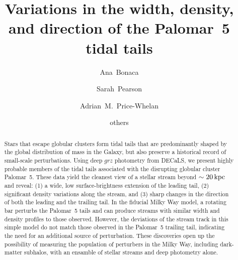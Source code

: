\documentclass[twocolumn]{aastex62}
\begin{document}
\sloppy\sloppypar\raggedbottom\frenchspacing %

\title{Variations in the width, density, and direction of the Palomar~5 tidal tails}

\author[0000-0002-7846-9787]{Ana~Bonaca}

\author[0000-0003-0256-5446]{Sarah~Pearson}

\author[0000-0003-0872-7098]{Adrian~M.~Price-Whelan}

\author{others}

\begin{abstract}\noindent %
Stars that escape globular clusters form tidal tails that are predominantly shaped by the global distribution of mass in the Galaxy, but also preserve a historical record of small-scale perturbations.
Using deep $grz$ photometry from DECaLS, we present highly probable members of the tidal tails associated with the disrupting globular cluster Palomar~5.
These data yield the cleanest view of a stellar stream beyond $\sim20\,\rm kpc$ and reveal: (1) a wide, low surface-brightness extension of the leading tail, (2) significant density variations along the stream, and (3) sharp changes in the direction of both the leading and the trailing tail.
In the fiducial Milky Way model, a rotating bar perturbs the Palomar~5 tails and can produce streams with similar width and density profiles to those observed.
However, the deviations of the stream track in this simple model do not match those observed in the Palomar~5 trailing tail, indicating the need for an additional source of perturbation.
These discoveries open up the possibility of measuring the population of perturbers in the Milky Way, including dark-matter subhalos, with an ensamble of stellar streams and deep photometry alone.
\end{abstract}

\end{document}
